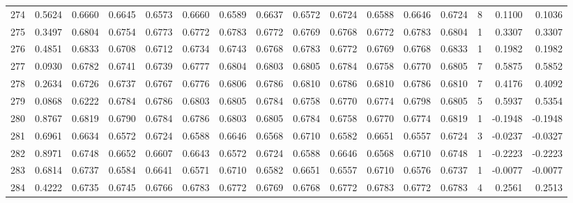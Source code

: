 \begin{tabular}{lrrrrrrrrrrrrrrr}
274 &      0.5624 &  0.6660 &  0.6645 &  0.6573 &  0.6660 &  0.6589 &  0.6637 &  0.6572 &  0.6724 &  0.6588 &   0.6646 &     0.6724 &      8 &                    0.1100 &                     0.1036 \\
275 &      0.3497 &  0.6804 &  0.6754 &  0.6773 &  0.6772 &  0.6783 &  0.6772 &  0.6769 &  0.6768 &  0.6772 &   0.6783 &     0.6804 &      1 &                    0.3307 &                     0.3307 \\
276 &      0.4851 &  0.6833 &  0.6708 &  0.6712 &  0.6734 &  0.6743 &  0.6768 &  0.6783 &  0.6772 &  0.6769 &   0.6768 &     0.6833 &      1 &                    0.1982 &                     0.1982 \\
277 &      0.0930 &  0.6782 &  0.6741 &  0.6739 &  0.6777 &  0.6804 &  0.6803 &  0.6805 &  0.6784 &  0.6758 &   0.6770 &     0.6805 &      7 &                    0.5875 &                     0.5852 \\
278 &      0.2634 &  0.6726 &  0.6737 &  0.6767 &  0.6776 &  0.6806 &  0.6786 &  0.6810 &  0.6786 &  0.6810 &   0.6786 &     0.6810 &      7 &                    0.4176 &                     0.4092 \\
279 &      0.0868 &  0.6222 &  0.6784 &  0.6786 &  0.6803 &  0.6805 &  0.6784 &  0.6758 &  0.6770 &  0.6774 &   0.6798 &     0.6805 &      5 &                    0.5937 &                     0.5354 \\
280 &      0.8767 &  0.6819 &  0.6790 &  0.6784 &  0.6786 &  0.6803 &  0.6805 &  0.6784 &  0.6758 &  0.6770 &   0.6774 &     0.6819 &      1 &                   -0.1948 &                    -0.1948 \\
281 &      0.6961 &  0.6634 &  0.6572 &  0.6724 &  0.6588 &  0.6646 &  0.6568 &  0.6710 &  0.6582 &  0.6651 &   0.6557 &     0.6724 &      3 &                   -0.0237 &                    -0.0327 \\
282 &      0.8971 &  0.6748 &  0.6652 &  0.6607 &  0.6643 &  0.6572 &  0.6724 &  0.6588 &  0.6646 &  0.6568 &   0.6710 &     0.6748 &      1 &                   -0.2223 &                    -0.2223 \\
283 &      0.6814 &  0.6737 &  0.6584 &  0.6641 &  0.6571 &  0.6710 &  0.6582 &  0.6651 &  0.6557 &  0.6710 &   0.6576 &     0.6737 &      1 &                   -0.0077 &                    -0.0077 \\
284 &      0.4222 &  0.6735 &  0.6745 &  0.6766 &  0.6783 &  0.6772 &  0.6769 &  0.6768 &  0.6772 &  0.6783 &   0.6772 &     0.6783 &      4 &                    0.2561 &                     0.2513 \\

\end{tabular}
